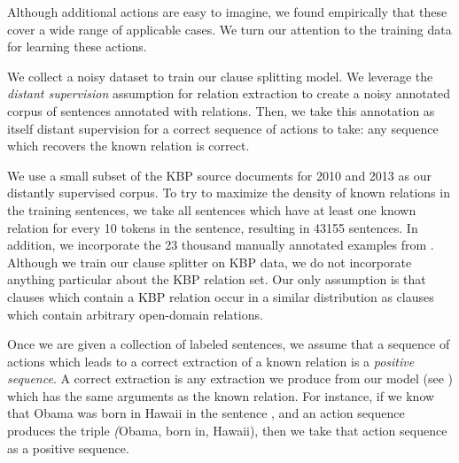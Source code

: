 Although additional actions are easy to imagine, we found empirically that
  these cover a wide range of applicable cases.
We turn our attention to the training data for learning these actions.

%
%
We collect a noisy dataset to train our clause splitting model.
We leverage the \textit{distant supervision} assumption for relation extraction
  to create a noisy annotated corpus of sentences annotated with relations.
Then, we take this annotation as itself distant supervision for a correct
  sequence of actions to take: any sequence which recovers the 
  known relation is correct.

We use a small subset of the KBP source documents for 
  2010 \cite{key:2010ji-kbpoverview}
  and 2013 \cite{key:2013surdeanu-kbpoverview}
  as our distantly supervised corpus.
To try to maximize the density of known relations in the training sentences,
  we take all sentences which have at least one known
  relation for every 10 tokens in the sentence,
  resulting in \num{43155} sentences.
In addition, we incorporate the 23 thousand manually annotated examples
  from .
Although we train our clause splitter on KBP data, we do not incorporate
  anything particular about the KBP relation set.
Our only assumption is that clauses which contain a KBP relation occur in
  a similar distribution as clauses which contain arbitrary open-domain
  relations.

Once we are given a collection of labeled sentences, 
  we assume that a sequence of actions which leads to a correct extraction of
  a known relation is a \textit{positive sequence}.
A correct extraction is any extraction we produce from our model
  (see ) which has the same arguments as the known
  relation.
For instance, if we know that Obama was born in Hawaii in the sentence
  , and an action sequence produces the triple
  \textit(Obama, born in, Hawaii), then we take that action sequence as
  a positive sequence.

